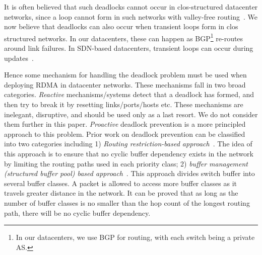 It is often believed that such deadlocks cannot occur in
clos-structured datacenter networks, since a loop cannot form in such networks
with valley-free routing~\cite{dcqcn}.   We now believe that deadlocks can also occur when transient
loops form in clos structured networks. In our datacenters, these can happen as
BGP\footnote{In our datacenters, we use BGP for routing, with each switch being
a private AS.} re-routes around link failures. In SDN-based datacenters,
transient loops can occur during updates~\cite{dionysus}. 

Hence some mechanism for handling the deadlock problem must be used when
deploying RDMA in datacenter networks.  These mechanisms fall in two broad
categories. {\em Reactive} mechanisms/systems detect that a deadlock has formed,
and then try to break it by resetting links/ports/hosts etc.  These mechanisms
are inelegant, disruptive, and should be used only as a last resort.  We do not
consider them further in this paper.  {\em Proactive} deadlock prevention is a
more principled approach to this problem.  Prior work on deadlock prevention can
be classified into two categories including 1) \textit{Routing restriction-based
approach}~\cite{tcpbolt,flich2012survey}. The idea of this approach is to ensure
that no cyclic buffer dependency exists in the network by limiting the routing
paths used in each priority class;  2) \textit{buffer management (structured
buffer pool) based approach}~\cite{gerla1980flow,karol2003prevention}. This
approach divides switch buffer into several buffer classes. A packet is allowed
to access more buffer classes as it travels greater distance in the network. It
can be proved that as long as the number of buffer classes is no smaller than
the hop count of the longest routing path, there will be no cyclic buffer
dependency.




